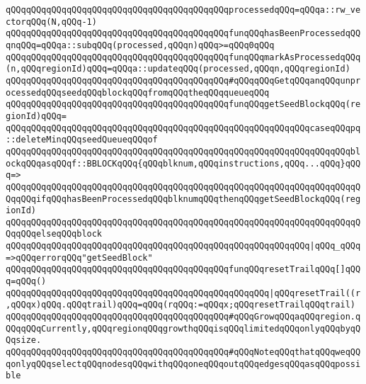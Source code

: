\newline
\verb|qQQqqQQqqQQqqQQqqQQqqQQqqQQqqQQqqQQqqQQqqQQqprocessedqQQq=qQQqa::rw_vectorqQQq(N,qQQq-1)|\newline
\newline
\verb|qQQqqQQqqQQqqQQqqQQqqQQqqQQqqQQqqQQqqQQqqQQqfunqQQqhasBeenProcessedqQQqnqQQq=qQQqa::subqQQq(processed,qQQqn)qQQq>=qQQq0qQQq|\newline
\verb|qQQqqQQqqQQqqQQqqQQqqQQqqQQqqQQqqQQqqQQqqQQqfunqQQqmarkAsProcessedqQQq(n,qQQqregionId)qQQq=qQQqa::updateqQQq(processed,qQQqn,qQQqregionId)|\newline
\newline
\verb|qQQqqQQqqQQqqQQqqQQqqQQqqQQqqQQqqQQqqQQqqQQq#qQQqqQQqGetqQQqanqQQqunprocessedqQQqseedqQQqblockqQQqfromqQQqtheqQQqqueueqQQq|\newline
\verb|qQQqqQQqqQQqqQQqqQQqqQQqqQQqqQQqqQQqqQQqqQQqfunqQQqgetSeedBlockqQQq(regionId)qQQq=|\newline
\verb|qQQqqQQqqQQqqQQqqQQqqQQqqQQqqQQqqQQqqQQqqQQqqQQqqQQqqQQqqQQqcaseqQQqpq::deleteMinqQQqseedQueueqQQqof|\newline
\verb|qQQqqQQqqQQqqQQqqQQqqQQqqQQqqQQqqQQqqQQqqQQqqQQqqQQqqQQqqQQqqQQqqQQqblockqQQqasqQQqf::BBLOCKqQQq{qQQqblknum,qQQqinstructions,qQQq...qQQq}qQQq=>|\newline
\verb|qQQqqQQqqQQqqQQqqQQqqQQqqQQqqQQqqQQqqQQqqQQqqQQqqQQqqQQqqQQqqQQqqQQqqQQqqQQqifqQQqhasBeenProcessedqQQqblknumqQQqthenqQQqgetSeedBlockqQQq(regionId)|\newline
\verb|qQQqqQQqqQQqqQQqqQQqqQQqqQQqqQQqqQQqqQQqqQQqqQQqqQQqqQQqqQQqqQQqqQQqqQQqqQQqelseqQQqblock|\newline
\verb|qQQqqQQqqQQqqQQqqQQqqQQqqQQqqQQqqQQqqQQqqQQqqQQqqQQqqQQqqQQq|\verb#|qQQq_qQQq=>qQQqerrorqQQq"getSeedBlock"#\newline
\newline
\verb|qQQqqQQqqQQqqQQqqQQqqQQqqQQqqQQqqQQqqQQqqQQqfunqQQqresetTrailqQQq[]qQQq=qQQq()|\newline
\verb|qQQqqQQqqQQqqQQqqQQqqQQqqQQqqQQqqQQqqQQqqQQqqQQqqQQq|\verb#|qQQqresetTrail((r,qQQqx)qQQq.qQQqtrail)qQQq=qQQq(rqQQq:=qQQqx;qQQqresetTrailqQQqtrail)#\newline
\newline
\newline
\verb|qQQqqQQqqQQqqQQqqQQqqQQqqQQqqQQqqQQqqQQqqQQq#qQQqGrowqQQqaqQQqregion.qQQqqQQqCurrently,qQQqregionqQQqgrowthqQQqisqQQqlimitedqQQqonlyqQQqbyqQQqsize.|\newline
\verb|qQQqqQQqqQQqqQQqqQQqqQQqqQQqqQQqqQQqqQQqqQQq#qQQqNoteqQQqthatqQQqweqQQqonlyqQQqselectqQQqnodesqQQqwithqQQqoneqQQqoutqQQqedgesqQQqasqQQqpossible|\newline
